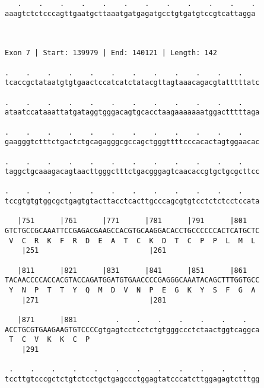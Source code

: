 \documentclass{article}
\begin{document}
\begin{Verbatim}
   .    .    .    .    .    .    .    .    .    .    .    .
aaagtctctcccagttgaatgcttaaatgatgagatgcctgtgatgtccgtcattagga
                                                           
                                                           
 
Exon 7 | Start: 139979 | End: 140121 | Length: 142
 
.    .    .    .    .    .    .    .    .    .    .    .    
tcaccgctataatgtgtgaactccatcatctatacgttagtaaacagacgtatttttatc
                                                            
.    .    .    .    .    .    .    .    .    .    .    .    
ataatccataaattatgataggtgggacagtgcacctaagaaaaaaatggactttttaga
                                                            
.    .    .    .    .    .    .    .    .    .    .    .    
gaagggtctttctgactctgcagagggcgccagctgggttttcccacactagtggaacac
                                                            
.    .    .    .    .    .    .    .    .    .    .    .    
taggctgcaaagacagtaacttgggctttctgacgggagtcaacaccgtgctgcgcttcc
                                                            
.    .    .    .    .    .    .    .    .    .    .    .    
tccgtgtgtggcgctgagtgtacttacctcacttgcccagcgtgtcctctctcctccata
                                                            
   |751      |761      |771      |781      |791      |801   
GTCTGCCGCAAATTCCGAGACGAAGCCACGTGCAAGGACACCTGCCCCCCACTCATGCTC
 V  C  R  K  F  R  D  E  A  T  C  K  D  T  C  P  P  L  M  L 
    |251                          |261                      
  
   |811      |821      |831      |841      |851      |861   
TACAACCCCACCACGTACCAGATGGATGTGAACCCCGAGGGCAAATACAGCTTTGGTGCC
 Y  N  P  T  T  Y  Q  M  D  V  N  P  E  G  K  Y  S  F  G  A 
    |271                          |281                      
  
   |871      |881         .    .    .    .    .    .    .   
ACCTGCGTGAAGAAGTGTCCCCgtgagtcctcctctgtgggccctctaactggtcaggca
 T  C  V  K  K  C  P                                        
    |291                                                    
  
 .    .    .    .    .    .    .    .    .    .    .    .   
tccttgtcccgctctgtctcctgctgagccctggagtatcccatcttggagagtctttgg
                                                            

\end{Verbatim}
\end{document}
